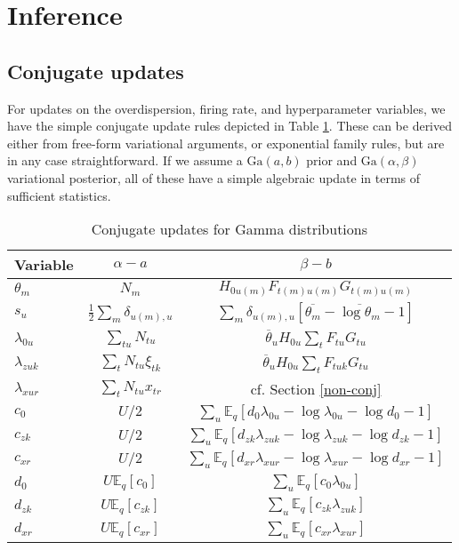 \documentclass{article} %
\begin{document}
\section{Inference}
\subsection{Conjugate updates}
For updates on the overdispersion, firing rate, and hyperparameter variables, we have the simple conjugate update rules depicted in Table \ref{conj_updates}. These can be derived either from free-form variational arguments, or exponential family rules, but are in any case straightforward\cite{Blei2006-oh}. If we assume a $\text{Ga}(a, b)$ prior and $\text{Ga}(\alpha, \beta)$ variational posterior, all of these have a simple algebraic update in terms of sufficient statistics.

\begin{table}[ht]
\caption{Conjugate updates for Gamma distributions}
\label{conj_updates}
\begin{center}
\begin{tabular}{lcc}
\multicolumn{1}{c}{\bf Variable}  &\multicolumn{1}{c}{\bf $\alpha - a$} &\multicolumn{1}{c}{\bf $\beta - b$}
\\ \hline 
$\theta_m$         &$N_m$  &$H_{0u(m)}F_{t(m)u(m)}G_{t(m)u(m)}$ \\
$s_u$         &$\frac{1}{2}\sum_m \delta_{u(m), u}$  &$\sum_m \delta_{u(m), u} [\overline{\theta_m} - \overline{\log \theta_m} - 1]$ \\
$\lambda_{0u}$         &$\sum_{tu} N_{tu}$  &$\overline{\theta}_u H_{0u}\sum_t F_{tu}G_{tu}$ \\
$\lambda_{zuk}$         &$\sum_t N_{tu} \xi_{tk}$  &$\overline{\theta}_u H_{0u}\sum_t F_{tuk}G_{tu}$ \\
$\lambda_{xur}$         &$\sum_t N_{tu} x_{tr}$  &cf. Section \ref{non-conj} \\
$c_{0}$         &$U/2$  &$\sum_u\mathbb{E}_q \left[d_{0} \lambda_{0u} - \log \lambda_{0u} - \log d_{0} - 1\right]$ \\
$c_{zk}$         &$U/2$  &$\sum_u\mathbb{E}_q \left[d_{zk} \lambda_{zuk} - \log \lambda_{zuk} - \log d_{zk} - 1\right]$ \\
$c_{xr}$         &$U/2$  &$\sum_u\mathbb{E}_q \left[d_{xr} \lambda_{xur} - \log \lambda_{xur} - \log d_{xr} - 1\right]$ \\
$d_{0}$         &$U\mathbb{E}_q[c_{0}]$  &$\sum_u\mathbb{E}_q \left[c_{0}\lambda_{0u}\right]$ \\
$d_{zk}$         &$U\mathbb{E}_q[c_{zk}]$  &$\sum_u\mathbb{E}_q \left[c_{zk}\lambda_{zuk}\right]$ \\
$d_{xr}$         &$U\mathbb{E}_q[c_{xr}]$  &$\sum_u\mathbb{E}_q \left[c_{xr}\lambda_{xur}\right]$ \\
\end{tabular}
\end{center}
\end{table}
\end{document}
